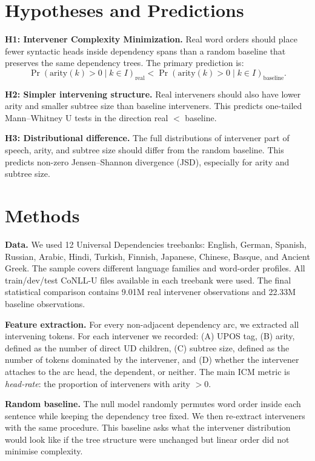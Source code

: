 \documentclass[11pt]{article}
\begin{document}
\section{Hypotheses and Predictions}
\textbf{H1: Intervener Complexity Minimization.} Real word orders should place fewer syntactic heads inside dependency spans than a random baseline that preserves the same dependency trees. The primary prediction is:
\[
\Pr(\text{arity}(k)>0 \mid k\in I)_{\text{real}}
<
\Pr(\text{arity}(k)>0 \mid k\in I)_{\text{baseline}}.
\]

\textbf{H2: Simpler intervening structure.} Real interveners should also have lower arity and smaller subtree size than baseline interveners. This predicts one-tailed Mann--Whitney U tests in the direction real $<$ baseline.

\textbf{H3: Distributional difference.} The full distributions of intervener part of speech, arity, and subtree size should differ from the random baseline. This predicts non-zero Jensen--Shannon divergence (JSD), especially for arity and subtree size.

\section{Methods}
\textbf{Data.} We used 12 Universal Dependencies treebanks: English, German, Spanish, Russian, Arabic, Hindi, Turkish, Finnish, Japanese, Chinese, Basque, and Ancient Greek. The sample covers different language families and word-order profiles. All train/dev/test CoNLL-U files available in each treebank were used. The final statistical comparison contains 9.01M real intervener observations and 22.33M baseline observations.

\textbf{Feature extraction.} For every non-adjacent dependency arc, we extracted all intervening tokens. For each intervener we recorded: (A) UPOS tag, (B) arity, defined as the number of direct UD children, (C) subtree size, defined as the number of tokens dominated by the intervener, and (D) whether the intervener attaches to the arc head, the dependent, or neither. The main ICM metric is \emph{head-rate}: the proportion of interveners with arity $>0$.

\textbf{Random baseline.} The null model randomly permutes word order inside each sentence while keeping the dependency tree fixed. We then re-extract interveners with the same procedure. This baseline asks what the intervener distribution would look like if the tree structure were unchanged but linear order did not minimise complexity.
\end{document}
